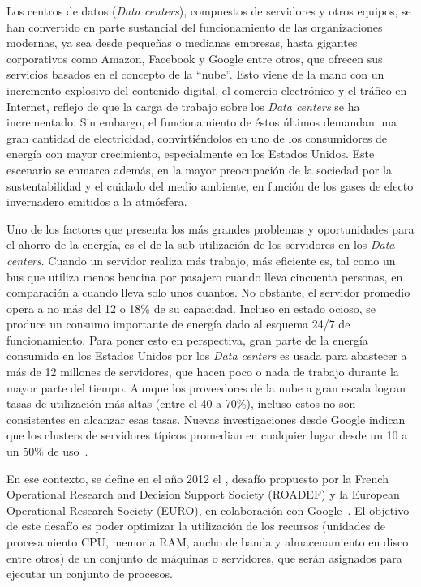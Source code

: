 \documentclass[../informe2.tex]{subfiles}
\begin{document}
Los centros de datos (\textit{Data centers}), compuestos de servidores y otros equipos, se han convertido en parte sustancial del funcionamiento de las organizaciones modernas, ya sea desde pequeñas o medianas empresas, hasta gigantes corporativos como Amazon, Facebook y Google entre otros, que ofrecen sus servicios basados en el concepto de la ``nube''. Esto viene de la mano con un incremento explosivo del contenido digital, el comercio electrónico y el tráfico en Internet, reflejo de que la carga de trabajo sobre los \textit{Data centers} se ha incrementado. Sin embargo, el funcionamiento de éstos últimos demandan una gran cantidad de electricidad, convirtiéndolos en uno de los consumidores de energía con mayor crecimiento, especialmente en los Estados Unidos. Este escenario se enmarca además, en la mayor preocupación de la sociedad por la sustentabilidad y el cuidado del medio ambiente, en función de los gases de efecto invernadero emitidos a la atmósfera. \par
\noindent Uno de los factores que presenta los más grandes problemas y oportunidades para el ahorro de la energía, es el de la sub-utilización de los servidores en los \textit{Data centers}.
Cuando un servidor realiza más trabajo, más eficiente es, tal como un bus que utiliza menos bencina por pasajero cuando lleva cincuenta personas, en comparación a cuando lleva solo unos cuantos. No obstante, el servidor promedio opera a no más del 12 o 18\% de su capacidad. Incluso en estado ocioso, se produce un consumo importante de energía dado al esquema 24/7 de funcionamiento. Para poner esto en perspectiva, gran parte de la energía consumida en los Estados Unidos por los \textit{Data centers} es usada para abastecer a más de 12 millones de servidores, que hacen poco o nada de trabajo durante la mayor parte del tiempo. Aunque los proveedores de la nube a gran escala logran tasas de utilización más altas (entre el 40 a 70\%), incluso estos no son consistentes en alcanzar esas tasas. Nuevas investigaciones desde Google indican que los clusters de servidores típicos promedian en cualquier lugar desde un 10 a un 50\% de uso~\cite{DCEfficiencyAssessment}. \par
\noindent En ese contexto, se define en el año 2012  el \mrp, desafío propuesto por la French Operational Research and Decision Support Society (ROADEF) y la European Operational Research Society (EURO), en colaboración con Google~\cite{2012ProblemDefinition}. El objetivo de este desafío es poder optimizar la utilización de los recursos (unidades de procesamiento CPU, memoria RAM, ancho de banda y almacenamiento en disco entre otros) de un conjunto de máquinas o servidores, que serán asignados para ejecutar un conjunto de procesos. \par
\end{document}
